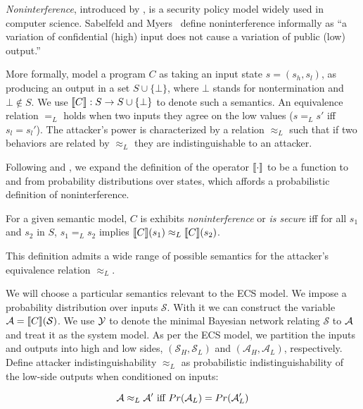 \documentclass[../thesis.tex]{subfiles}
\begin{document}
\emph{Noninterference}, introduced by \cite{gm82security},
is a security policy model widely used in computer science.
Sabelfeld and Myers~\cite{sabelfeld03journal} define noninterference
informally as ``a variation of confidential (high)
input does not cause a variation of public (low) output.''

More formally, model a program $C$ as taking an
input state $s = (s_h,s_l)$,
as producing an output in a set $S \cup \{ \bot \}$,
where
$\bot$ stands for nontermination
and $\bot \notin S$.
We use $\llbracket C\rrbracket  : S \rightarrow S \cup \{ \bot \}$
to denote such a semantics.
An equivalence relation $=_L$ holds when
two inputs they agree on the low values ($s=_Ls'$ iff
$s_l = s_l'$). The attacker's power is characterized
by a relation $\approx_L$ such that if two behaviors
are related by $\approx_L$ they are indistinguishable
to an attacker. 

Following \cite{tschantz15csf} and \cite{datta2017use},
we expand the definition of the operator $\llbracket \cdot\rrbracket $
to be a function to and from probability distributions
over states, which affords a probabilistic definition
of noninterference.

\begin{dfn}
For a given semantic model, $C$ is
  exhibits \emph{noninterference} or \emph{is secure} iff for all $s_1$ and $s_2$ in $S$, $s_1 =_L s_2$ implies $\llbracket C\rrbracket(s_1) \approx_L \llbracket C\rrbracket(s_2)$.
\end{dfn}

This definition admits a wide range of possible semantics for
the attacker's equivalence relation $\approx_L$.

We will choose a particular semantics relevant
to the ECS model.
We impose a probability distribution over inputs
$\mathcal{S}$.
With it we can construct the variable 
$\mathcal{A} = \llbracket C\rrbracket(\mathcal{S})$.
We use $\mathcal{Y}$ to denote the minimal Bayesian network relating
$\mathcal{S}$ to $\mathcal{A}$ and treat it as the system model.
As per the ECS model, we partition the inputs
and outputs into high and low sides,
$(\mathcal{S}_H, \mathcal{S}_L)$ and
$(\mathcal{A}_H, \mathcal{A}_L)$,
respectively.
Define attacker indistinguishability $\approx_L$
as probabilistic indistinguishability of the low-side outputs when
conditioned on inputs:

\begin{dfn}
  $$\mathcal{A} \approx_L \mathcal{A}' \text{ iff } Pr(\mathcal{A}_L) = Pr
  (\mathcal{A}_L')$$
\end{dfn}
\end{document}
